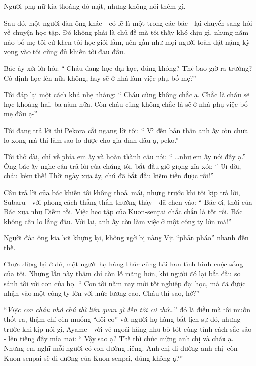 \documentclass[../main.tex]{subfiles}
\begin{document}
Người phụ nữ kia thoáng đỏ mặt, nhưng không nói thêm gì.

\ct

Sau đó, một người đàn ông khác - có lẽ là một trong các bác - lại chuyển sang hỏi về chuyện học tập. Đó không phải là chủ đề mà tôi thấy khó chịu gì, nhưng năm nào bố mẹ tôi cứ khen tôi học giỏi lắm, nên gần như mọi người toàn đặt nặng kỳ vọng vào tôi cũng đủ khiến tôi đau đầu.

Bác ấy xởi lởi hỏi: ``{\color{red} Cháu đang học đại học, đúng không? Thế bao giờ ra trường? Có định học lên nữa không, hay sẽ ở nhà làm việc phụ bố mẹ?}''

Tôi đáp lại một cách khá nhẹ nhàng: ``{\color{red} Cháu cũng không chắc ạ. Chắc là cháu sẽ học khoảng hai, ba năm nữa. Còn cháu cũng không chắc là sẽ ở nhà phụ việc bố mẹ đâu ạ-}''

Tôi đang trả lời thì Pekora cắt ngang lời tôi: ``{\color{red} Vì đến bản thân anh ấy còn chưa lo xong mà thi làm sao lo được cho gia đình đâu ạ, peko.}''

Tôi thở dài, chỉ về phía em ấy và hoàn thành câu nói: ``{\color{red} \dots như em ấy nói đấy ạ.}'' Ông bác ấy nghe câu trả lời của chúng tôi, bắt đầu giở giọng xỉa xói: ``{\color{red} Ui dời, cháu kém thế! Thời ngày xưa ấy, chú đã bắt đầu kiếm tiền được rồi!}''

Câu trả lời của bác khiến tôi không thoải mái, nhưng trước khi tôi kịp trả lời, Subaru - với phong cách thẳng thắn thường thấy - đã chen vào: ``{\color{red} Bác ơi, thời của Bác xưa như Diễm rồi. Việc học tập của Kuon-senpai chắc chắn là tốt rồi. Bác không cần lo lắng đâu. Với lại, anh ấy còn làm việc ở một công ty lớn mà!}''

Người đàn ông kia hơi khựng lại, không ngờ bị nàng Vịt ``phản pháo'' nhanh đến thế.

\ct

Chưa dừng lại ở đó, một người họ hàng khác cũng hỏi han tình hình cuộc sống của tôi. Nhưng lần này thậm chí còn lỗ mãng hơn, khi người đó lại bắt đầu so sánh tôi với con của họ. ``{\color{red} Con tôi năm nay mới tốt nghiệp đại học, mà đã được nhận vào một công ty lớn với mức lương cao. Cháu thì sao, hở?}''

``\textit{Việc con cháu nhà chú thì liên quan gì đến tôi cơ chứ\dots}'' đó là điều mà tôi muốn thốt ra, thậm chí còn muống ``đôi co'' với người họ hàng bất lịch sự đó, nhưng trước khi kịp nói gì, Ayame - với vẻ ngoài hăng như bò tót cùng tính cách sắc sảo - lên tiếng đầy mỉa mai: ``{\color{red} Vậy sao ạ? Thế thì chúc mừng anh chị và cháu ạ. Nhưng em nghĩ mỗi người có con đường riêng. Anh chị đi đường anh chị, còn Kuon-senpai sẽ đi đường của Kuon-senpai, đúng không ạ?}''
\end{document}
